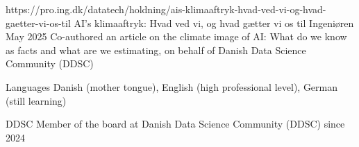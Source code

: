 

\begin{cventries}

    \cventry
    {https://pro.ing.dk/datatech/holdning/ais-klimaaftryk-hvad-ved-vi-og-hvad-gaetter-vi-os-til} %
    {AI's klimaaftryk: Hvad ved vi, og hvad gætter vi os til} %
    {Ingeniøren} %
    {May 2025} %
    { %
    Co-authored an article on the climate image of AI: What do we know as facts and what are we estimating, on behalf of Danish Data Science Community (DDSC)
    }


\end{cventries}



\begin{cvskills}


\cvskill
{Languages} %
{Danish (mother tongue), English (high professional level), German (still learning)} %

\cvskill
{DDSC} %
{Member of the board at Danish Data Science Community (DDSC) since 2024} %


\end{cvskills}
